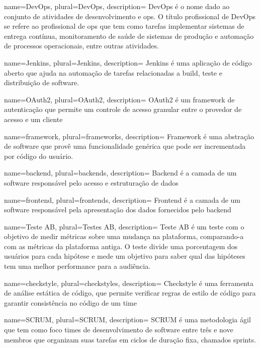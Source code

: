 {
  name=DevOps,
  plural=DevOps,
  description={
    DevOps é o nome dado ao conjunto de atividades de desenvolvimento e \gls{ops}. O título profissional de DevOps se refere ao profissional de \gls{ops} que tem como tarefas implementar sistemas de entrega contínua, monitoramento de saúde de sistemas de produção e automação de processos operacionais, entre outras atividades.
  }
}

{
  name=Jenkins,
  plural=Jenkins,
  description={
    Jenkins é uma aplicação de código aberto que ajuda na automação de tarefas relacionadas a build, teste e distribuição de software.
  }
}

{
  name=OAuth2,
  plural=OAuth2,
  description={
    OAuth2 é um framework de autenticação que permite um controle de acesso granular entre o provedor de acesso e um cliente
  }
}

{
  name=framework,
  plural=frameworks,
  description={
    Framework é uma abstração de software que provê uma funcionalidade genérica que pode ser incrementada por código do usuário.
  }
}

{
  name=backend,
  plural=backends,
  description={
    Backend é a camada de um software responsável pelo acesso e estruturação de dados
  }
}

{
  name=frontend,
  plural=frontends,
  description={
    Frontend é a camada de um software responsável pela apresentação dos dados fornecidos pelo \gls{backend}
  }
}

{
  name=Teste AB,
  plural=Testes AB,
  description={
    Teste AB é um teste com o objetivo de medir métricas sobre uma mudança na plataforma, comparando-a com as métricas da plataforma antiga. O teste divide uma porcentagem dos usuários para cada hipótese e mede um objetivo para saber qual das hipóteses tem uma melhor performance para a audiência.
  }
}

{
  name=checkstyle,
  plural=checkstyles,
  description={
    Checkstyle é uma ferramenta de análise estática de código, que permite verificar regras de estilo de código para garantir consistência no código de um time
  }
}

{
  name=SCRUM,
  plural=SCRUM,
  description={
    SCRUM é uma metodologia ágil que tem como foco times de desenvolvimento de software entre três e nove membros que organizam suas tarefas em ciclos de duração fixa, chamados sprints.
  }
}

